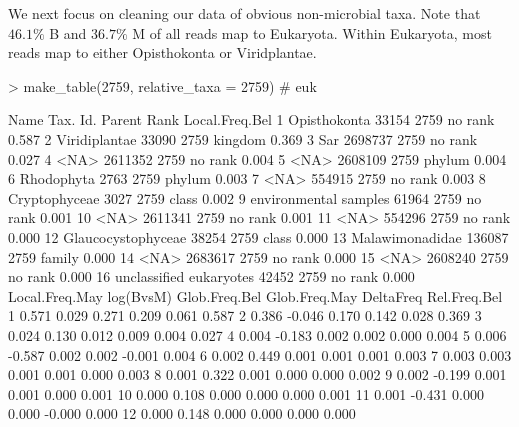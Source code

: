 \documentclass{article}
\begin{document}
We next focus on cleaning our data of obvious non-microbial taxa. Note that $46.1\%$ B and $36.7\%$ M of
all reads map to Eukaryota.
Within Eukaryota, most reads map to either Opisthokonta or Viridplantae.
\begin{Schunk}
\begin{Sinput}
> make_table(2759, relative_taxa = 2759)  # euk
\end{Sinput}
\begin{Soutput}
                      Name Tax. Id. Parent    Rank Local.Freq.Bel
1             Opisthokonta    33154   2759 no rank          0.587
2            Viridiplantae    33090   2759 kingdom          0.369
3                      Sar  2698737   2759 no rank          0.027
4                     <NA>  2611352   2759 no rank          0.004
5                     <NA>  2608109   2759  phylum          0.004
6               Rhodophyta     2763   2759  phylum          0.003
7                     <NA>   554915   2759 no rank          0.003
8            Cryptophyceae     3027   2759   class          0.002
9    environmental samples    61964   2759 no rank          0.001
10                    <NA>  2611341   2759 no rank          0.001
11                    <NA>   554296   2759 no rank          0.000
12      Glaucocystophyceae    38254   2759   class          0.000
13         Malawimonadidae   136087   2759  family          0.000
14                    <NA>  2683617   2759 no rank          0.000
15                    <NA>  2608240   2759 no rank          0.000
16 unclassified eukaryotes    42452   2759 no rank          0.000
   Local.Freq.May log(BvsM) Glob.Freq.Bel Glob.Freq.May DeltaFreq Rel.Freq.Bel
1           0.571     0.029         0.271         0.209     0.061        0.587
2           0.386    -0.046         0.170         0.142     0.028        0.369
3           0.024     0.130         0.012         0.009     0.004        0.027
4           0.004    -0.183         0.002         0.002     0.000        0.004
5           0.006    -0.587         0.002         0.002    -0.001        0.004
6           0.002     0.449         0.001         0.001     0.001        0.003
7           0.003     0.003         0.001         0.001     0.000        0.003
8           0.001     0.322         0.001         0.000     0.000        0.002
9           0.002    -0.199         0.001         0.001     0.000        0.001
10          0.000     0.108         0.000         0.000     0.000        0.001
11          0.001    -0.431         0.000         0.000    -0.000        0.000
12          0.000     0.148         0.000         0.000     0.000        0.000

\end{Soutput}
\end{Schunk}
\end{document}
